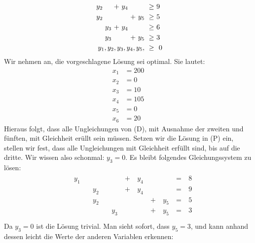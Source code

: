\documentclass [a4paper,11pt]{article}
\begin{document}
\begin{enumerate}
\begin{enumerate}
\begin{align*}
\begin{alignedat}{10}
                    &&  & &\ y_2 & & &\ + &\ y_4 & & &\ \geq &\ 9\ \\
                    &&  & &\ y_2 & & & & &\ + &\ y_5 &\ \geq &\ 5\ \\
                    && & & & &\ y_3 &\ + &\ y_4 & & &\ \geq &\ 6\ \\
                    && & & & &\ y_3 & & &\ + &\ y_5 &\ \geq &\ 3\ \\
                    && & & & & & & & & \llap{$y_1,y_2,y_3,y_4,y_5,$} &\ \geq &\ 0
                    \end{alignedat}
                    \end{align*}
                    Wir nehmen an, die vorgeschlagene Lösung sei optimal. Sie lautet:
                    \begin{align*}
                        x_1 &= 200\\
                        x_2 &= 0\\
                        x_3 &= 10\\
                        x_4 &= 105\\
                        x_5 &= 0\\
                        x_6 &= 20
                    \end{align*}
                    Hieraus folgt, dass alle Ungleichungen von (D), mit Ausnahme der zweiten und fünften, mit Gleichheit erüllt sein müssen. Setzen wir die
                    Lösung in (P) ein, stellen wir fest, dass alle Ungleichungen mit Gleichheit erfüllt sind, bis auf die dritte. Wir wissen also schonmal:
                    $y_3 = 0$. Es bleibt folgendes Gleichungssystem zu lösen:
                    \begin{align*}
                    \begin{alignedat}{10}
                    && y_1 &    &      & & &\ + &\ y_4 & & &\ = &\ 8\ \\
                    &&     &    &\ y_2 & & &\ + &\ y_4 & & &\ = &\ 9\ \\
                    &&     &    &\ y_2 & & & & &\ + &\ y_5 &\ = &\ 5\ \\
                    &&     &    & & &\ y_3 & & &\ + &\ y_5 &\ = &\ 3\ \\
                    \end{alignedat}
                    \end{align*}
                    Da $y_3 = 0$ ist die Lösung trivial. Man sieht sofort, dass $y_5 = 3$, und kann anhand dessen leicht die Werte der anderen Variablen erkennen:

\end{enumerate}
\end{enumerate}
\end{document}
